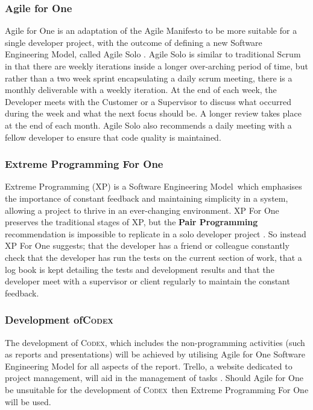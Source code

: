\documentclass[review]{cmpreport}
\newcommand{\sem}{Software Engineering Model}
\newcommand{\Codex}{\textsc{Codex}}
\begin{document}
	\subsubsection{Agile for One}
	Agile for One is an adaptation of the Agile Manifesto to be more suitable for a single developer project, with the outcome of defining a new \sem , called Agile Solo \cite{AgileSolo}. Agile Solo is similar to traditional Scrum in that there are weekly iterations inside a longer over-arching period of time, but rather than a two week sprint encapsulating a daily scrum meeting, there is a monthly deliverable with a weekly iteration. At the end of each week, the Developer meets with the Customer or a Supervisor to discuss what occurred during the week and what the next focus should be. A longer review takes place at the end of each month. Agile Solo also recommends a daily meeting with a fellow developer to ensure that code quality is maintained. 
	
	\subsubsection{Extreme Programming For One}
	Extreme Programming (XP) is a \sem \ which emphasises the importance of constant feedback and maintaining simplicity in a system, allowing a project to thrive in an ever-changing environment. XP For One preserves the traditional stages of XP, but the \textbf{Pair Programming} recommendation is impossible to replicate in a solo developer project \cite{SoloXP}. So instead XP For One suggests; that the developer has a friend or colleague constantly check that the developer has run the tests on the current section of work, that a log book is kept detailing the tests and development results and that the developer meet with a supervisor or client regularly to maintain the constant feedback. 
	
	\subsubsection{Development of\Codex}
	The development of \Codex, which includes the non-programming activities (such as reports and presentations) will be achieved by utilising Agile for One Software Engineering Model for all aspects of the report. Trello, a website dedicated to project management, will aid in the management of tasks \cite{Trello}. Should Agile for One be unsuitable for the development of \Codex \ then Extreme Programming For One will be used. 
	
\end{document}
